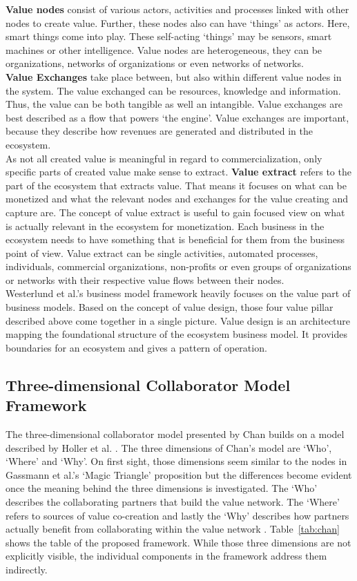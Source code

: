 		\textbf{Value nodes} consist of various actors, activities and processes linked with other nodes to create value. Further, these nodes also can have `things' as actors. Here, smart things come into play. These self-acting `things' may be sensors, smart machines or other intelligence. Value nodes are heterogeneous, they can be organizations, networks of organizations or even networks of networks.\\
		\textbf{Value Exchanges} take place between, but also within different value nodes in the system. The value exchanged can be resources, knowledge and information. Thus, the value can be both tangible as well an intangible. Value exchanges are best described as a flow that powers `the engine'. Value exchanges are important, because they describe how revenues are generated and distributed in the ecosystem.\\
		As not all created value is meaningful in regard to commercialization, only specific parts of created value make sense to extract. \textbf{Value extract} refers to the part of the ecosystem that extracts value. That means it focuses on what can be monetized and what the relevant nodes and exchanges for the value creating and capture are. The concept of value extract is useful to gain focused view on what is actually relevant in the ecosystem for monetization. Each business in the ecosystem needs to have something that is beneficial for them from the business point of view. Value extract can be single activities, automated processes, individuals, commercial organizations, non-profits or even groups of organizations or networks with their respective value flows between their nodes.\\
		Westerlund et al.'s business model framework heavily focuses on the value part of business models. Based on the concept of value design, those four value pillar described above come together in a single picture. Value design is an architecture mapping the foundational structure of the ecosystem business model. It provides boundaries for an ecosystem and gives a pattern of operation.
	\vspace{-2em}
	\subsection{Three-dimensional Collaborator Model Framework}
	\vspace{-1em}	
		The three-dimensional collaborator model presented by Chan \cite{chan} builds on a model described by Holler et al. \cite{holler}. The three dimensions of Chan's model are `Who', `Where' and `Why'. On first sight, those dimensions seem similar to the nodes in Gassmann et al.'s `Magic Triangle' proposition but the differences become evident once the meaning behind the three dimensions is investigated. The `Who' describes the collaborating partners that build the value network. The `Where' refers to sources of value co-creation and lastly the `Why' describes how partners actually benefit from collaborating within the value network \cite{chan}. Table~\ref{tab:chan} shows the table of the proposed framework. While those three dimensions are not explicitly visible, the individual components in the framework address them indirectly.

